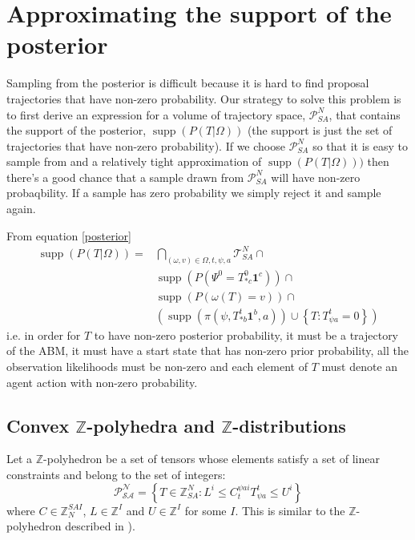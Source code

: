 \documentclass{article}
\DeclareMathOperator\supp{supp}
\begin{document}
\section{Approximating the support of the posterior}

Sampling from the posterior is difficult because it is hard to find proposal trajectories that have non-zero probability. Our strategy to solve this problem is to first derive an expression for a volume of trajectory space, $\mathcal{P}^N_{SA}$, that contains the support of the posterior, $\supp(P(T|\Omega))$ (the support is just the set of trajectories that have non-zero probability). If we choose $\mathcal{P}^N_{SA}$ so that it is easy to sample from and a relatively tight approximation of $\supp(P(T|\Omega)))$ then there's a good chance that a sample drawn from $\mathcal{P}^N_{SA}$ will have non-zero probaqbility. If a sample has zero probability we simply reject it and sample again.

From equation \eqref{posterior}
\begin{equation}
\begin{aligned}
\supp (P( T |\Omega)) = 
& \bigcap_{(\omega,v) \in \Omega,t, \psi, a} \mathcal{T}^N_{SA} \cap \\ 
&\supp(P(\Psi^0 = T^0_{* c}\mathbf{1}^c)) \cap \\
& \supp\left(P\left(\omega(T)=v\right)\right) \cap \\
&\left( \supp\left(\pi(\psi,T^t_{* b}\mathbf{1}^b,a)\right) \cup \left\{T:T^t_{\psi a} = 0\right\} \right)
\end{aligned}
\label{support}
\end{equation}
i.e. in order for $T$ to have non-zero posterior probability, it must be a trajectory of the ABM, it must have a start state that has non-zero prior probability, all the observation likelihoods must be non-zero and each element of $T$ must denote an agent action with non-zero probability.


\subsection{Convex $\mathbb{Z}$-polyhedra and $\mathbb{Z}$-distributions}
\label{BPoly}

Let a $\mathbb{Z}$-polyhedron be a set of tensors whose elements satisfy a set of linear constraints and belong to the set of integers: 
\[
\mathcal{P^N_{SA}} = \left\{ T\in\mathbb{\mathbb{Z}}^N_{SA} : L^{i} \le  C^{\psi ai}_t T^t_{\psi a} \le U^{i} \right\}
\]
where $C \in \mathbb{Z}^{SAI}_{N}$, $L \in \mathbb{Z}^I$ and $U \in \mathbb{Z}^I$ for some $I$. This is similar to the $\mathbb{Z}$-polyhedron described in \cite{quinton1996manipulating}).
\end{document}
